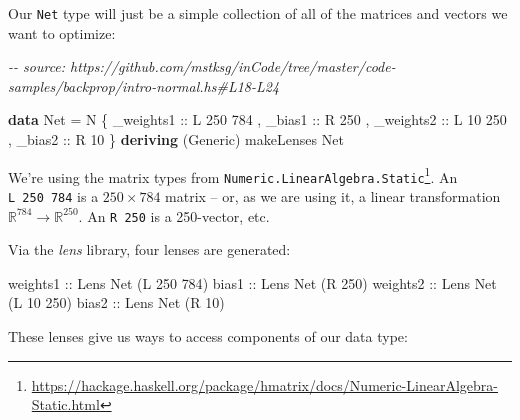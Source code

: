 \documentclass[]{article}
\newenvironment{Shaded}{}{}
\newcommand{\CommentTok}[1]{\textcolor[rgb]{0.38,0.63,0.69}{\textit{#1}}}
\newcommand{\DataTypeTok}[1]{\textcolor[rgb]{0.56,0.13,0.00}{#1}}
\newcommand{\DecValTok}[1]{\textcolor[rgb]{0.25,0.63,0.44}{#1}}
\newcommand{\KeywordTok}[1]{\textcolor[rgb]{0.00,0.44,0.13}{\textbf{#1}}}
\newcommand{\NormalTok}[1]{#1}
\newcommand{\OtherTok}[1]{\textcolor[rgb]{0.00,0.44,0.13}{#1}}
\renewcommand{\href}[2]{#2\footnote{\url{#1}}}
\begin{document}
Our \texttt{Net} type will just be a simple collection of all of the matrices
and vectors we want to optimize:

\begin{Shaded}
\begin{Highlighting}[]
\CommentTok{{-}{-} source: https://github.com/mstksg/inCode/tree/master/code{-}samples/backprop/intro{-}normal.hs\#L18{-}L24}

\KeywordTok{data} \DataTypeTok{Net} \OtherTok{=} \DataTypeTok{N}\NormalTok{ \{}\OtherTok{ \_weights1 ::} \DataTypeTok{L} \DecValTok{250} \DecValTok{784}
\NormalTok{             ,}\OtherTok{ \_bias1    ::} \DataTypeTok{R} \DecValTok{250}
\NormalTok{             ,}\OtherTok{ \_weights2 ::} \DataTypeTok{L} \DecValTok{10} \DecValTok{250}
\NormalTok{             ,}\OtherTok{ \_bias2    ::} \DataTypeTok{R} \DecValTok{10}
\NormalTok{             \}}
  \KeywordTok{deriving}\NormalTok{ (}\DataTypeTok{Generic}\NormalTok{)}
\NormalTok{makeLenses \textquotesingle{}}\DataTypeTok{\textquotesingle{}Net}
\end{Highlighting}
\end{Shaded}

We're using the matrix types from
\href{https://hackage.haskell.org/package/hmatrix/docs/Numeric-LinearAlgebra-Static.html}{\texttt{Numeric.LinearAlgebra.Static}}.
An \texttt{L\ 250\ 784} is a \(250 \times 784\) matrix -- or, as we are using
it, a linear transformation \(\mathbb{R}^{784} \rightarrow \mathbb{R}^{250}\).
An \texttt{R\ 250} is a 250-vector, etc.

Via the \emph{lens} library, four lenses are generated:

\begin{Shaded}
\begin{Highlighting}[]
\OtherTok{weights1 ::} \DataTypeTok{Lens\textquotesingle{}} \DataTypeTok{Net}\NormalTok{ (}\DataTypeTok{L} \DecValTok{250} \DecValTok{784}\NormalTok{)}
\OtherTok{bias1    ::} \DataTypeTok{Lens\textquotesingle{}} \DataTypeTok{Net}\NormalTok{ (}\DataTypeTok{R} \DecValTok{250}\NormalTok{)}
\OtherTok{weights2 ::} \DataTypeTok{Lens\textquotesingle{}} \DataTypeTok{Net}\NormalTok{ (}\DataTypeTok{L} \DecValTok{10}  \DecValTok{250}\NormalTok{)}
\OtherTok{bias2    ::} \DataTypeTok{Lens\textquotesingle{}} \DataTypeTok{Net}\NormalTok{ (}\DataTypeTok{R} \DecValTok{10}\NormalTok{)}
\end{Highlighting}
\end{Shaded}

These lenses give us ways to access components of our data type:
\end{document}
